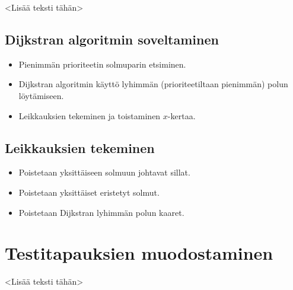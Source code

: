 <Lisää teksti tähän>

  \subsection{Dijkstran algoritmin soveltaminen}

  \begin{itemize}
    \item Pienimmän prioriteetin solmuparin etsiminen.
    \item Dijkstran algoritmin käyttö lyhimmän (prioriteetiltaan pienimmän) polun löytämiseen.
    \item Leikkauksien tekeminen ja toistaminen \(x\)-kertaa.
  \end{itemize}

  \subsection{Leikkauksien tekeminen}

  \begin{itemize}
    \item Poistetaan yksittäiseen solmuun johtavat sillat.
    \item Poistetaan yksittäiset eristetyt solmut.
    \item Poistetaan Dijkstran lyhimmän polun kaaret.
  \end{itemize}

\section{Testitapauksien muodostaminen}

<Lisää teksti tähän>
